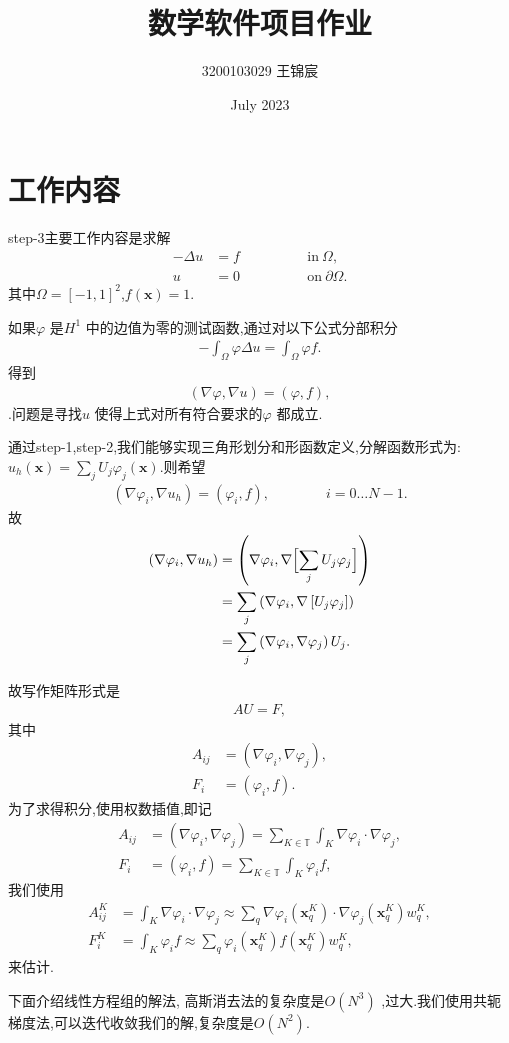 \documentclass[UTF8]{ctexart}
\title{数学软件项目作业}
\author{3200103029 王锦宸}
\date{July 2023}
\begin{document}
\maketitle
\section{工作内容}
step-3主要工作内容是求解
\begin{align*}
  -\Delta u &= f \qquad\qquad & \text{in}\ \Omega,
  \\
  u &= 0 \qquad\qquad & \text{on}\ \partial\Omega.
\end{align*}
其中$\Omega=[-1,1]^2$,$f(\mathbf x)=1$.\par
如果$\varphi$ 是$H^1$ 中的边值为零的测试函数,通过对以下公式分部积分
\begin{align*}
  -\int_\Omega \varphi \Delta u = \int_\Omega \varphi f.
\end{align*}
得到\begin{align*}
  (\nabla\varphi, \nabla u)
   = (\varphi, f),
\end{align*}
.问题是寻找$u$ 使得上式对所有符合要求的$\varphi$ 都成立.\par
通过step-1,step-2,我们能够实现三角形划分和形函数定义,分解函数形式为:$u_h(\mathbf x)=\sum_j U_j \varphi_j(\mathbf
x)$.则希望\begin{align*}
  (\nabla\varphi_i, \nabla u_h)
   = (\varphi_i, f),
   \qquad\qquad
   i=0\ldots N-1.
\end{align*}
故
\begin{align*}
  (\nabla\varphi_i, \nabla u_h)
  &= \left(\nabla\varphi_i, \nabla \Bigl[\sum_j U_j \varphi_j\Bigr]\right)
\\
  &= \sum_j \left(\nabla\varphi_i, \nabla \left[U_j \varphi_j\right]\right)
\\
  &= \sum_j \left(\nabla\varphi_i, \nabla \varphi_j \right) U_j.
\end{align*}

故写作矩阵形式是\begin{align*}
  A U = F,
\end{align*}
其中\begin{align*}
  A_{ij} &= (\nabla\varphi_i, \nabla \varphi_j),
  \\
  F_i &= (\varphi_i, f).
\end{align*}
为了求得积分,使用权数插值,即记\begin{align*}
    A_{ij} &= (\nabla\varphi_i, \nabla \varphi_j)
    = \sum_{K \in {\mathbb T}} \int_K \nabla\varphi_i \cdot \nabla \varphi_j,
    \\
    F_i &= (\varphi_i, f)
    = \sum_{K \in {\mathbb T}} \int_K \varphi_i f,
  \end{align*}
  我们使用\begin{align*}
    A^K_{ij} &=
    \int_K \nabla\varphi_i \cdot \nabla \varphi_j
    \approx
    \sum_q \nabla\varphi_i(\mathbf x^K_q) \cdot \nabla
    \varphi_j(\mathbf x^K_q) w_q^K,
    \\
    F^K_i &=
    \int_K \varphi_i f
    \approx
    \sum_q \varphi_i(\mathbf x^K_q) f(\mathbf x^K_q) w^K_q,
  \end{align*}
  来估计.\par
  下面介绍线性方程组的解法,
高斯消去法的复杂度是$O(N^3) $ ,过大.我们使用共轭梯度法,可以迭代收敛我们的解,复杂度是$O(N^2)$.\newpage
\end{document}
